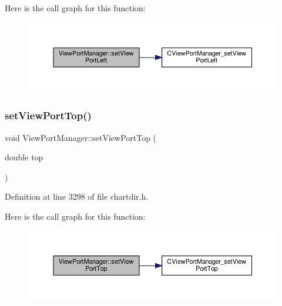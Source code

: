 Here is the call graph for this function\+:
\nopagebreak
\begin{figure}[H]
\begin{center}
\leavevmode
\includegraphics[width=350pt]{class_view_port_manager_a1270422432f386ab1a0f3c94990c1567_cgraph}
\end{center}
\end{figure}
\mbox{\label{class_view_port_manager_a367c1ca90319fd6f8261ca5d8fe4a0d3}} 
\subsubsection{\texorpdfstring{set\+View\+Port\+Top()}{setViewPortTop()}}
{\footnotesize\ttfamily void View\+Port\+Manager\+::set\+View\+Port\+Top (\begin{DoxyParamCaption}\item[{double}]{top }\end{DoxyParamCaption})\hspace{0.3cm}{\ttfamily [inline]}}



Definition at line 3298 of file chartdir.\+h.

Here is the call graph for this function\+:
\nopagebreak
\begin{figure}[H]
\begin{center}
\leavevmode
\includegraphics[width=350pt]{class_view_port_manager_a367c1ca90319fd6f8261ca5d8fe4a0d3_cgraph}
\end{center}
\end{figure}
\mbox{\label{class_view_port_manager_adf549fbcace60757aedebff857d9c0dc}} 
